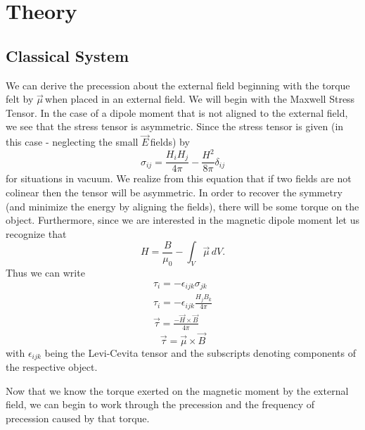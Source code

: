 \documentclass{article}
\newcommand{\dipole}{$\vec{\mu}\,$}
\newcommand{\E}{$\vec{E}\,$}
\begin{document}
\section{Theory}
	\subsection{Classical System}
	We can derive the precession about the external field beginning with the torque felt by \dipole when placed in an external field.  We will begin with the Maxwell Stress Tensor.  In the case of a dipole moment that is not aligned to the external field, we see that the stress tensor is asymmetric.  Since the stress tensor is given (in this case - neglecting the small \E fields) by
	\begin{equation*}
		\sigma_{ij} = \frac{H_iH_j}{4\pi} - \frac{H^2}{8\pi}\delta_{ij}
	\end{equation*}
	for situations in vacuum.  We realize from this equation that if two fields are not colinear then the tensor will be asymmetric.  In order to recover the symmetry (and minimize the energy by aligning the fields), there will be some torque on the object.  Furthermore, since we are interested in the magnetic dipole moment let us recognize that
	\begin{equation*}
		H = \frac{B}{\mu_0} - \int_{V}\vec{\mu}\,dV.
	\end{equation*}
	Thus we can write
	\begin{gather*}
		\tau_i = -\epsilon_{ijk}\sigma_{jk}\\
		\tau_i = -\epsilon_{ijk}\frac{H_jB_k}{4\pi}\\
		\vec{\tau} = \frac{-\vec{H} \times \vec{B}}{4\pi}
	\end{gather*}
	\begin{equation}
		\vec{\tau} = \vec{\mu} \times \vec{B}
	\end{equation}
	with $\epsilon_{ijk}$ being the Levi-Cevita tensor and the subscripts denoting components of the respective object.

	\vspace{.25cm}

	Now that we know the torque exerted on the magnetic moment by the external field, we can begin to work through the precession and the frequency of precession caused by that torque.
	\vspace{.25cm}
\end{document}
